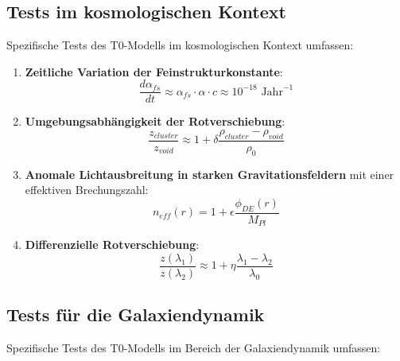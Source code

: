 \documentclass[a4paper,12pt]{article}
\begin{document}
	\subsection{Tests im kosmologischen Kontext}
	
	Spezifische Tests des T0-Modells im kosmologischen Kontext umfassen:
	
	\begin{enumerate}
		\item \textbf{Zeitliche Variation der Feinstrukturkonstante}:
		\begin{equation}
			\frac{d\alpha_{fs}}{dt} \approx \alpha_{fs} \cdot \alpha \cdot c \approx 10^{-18} \text{ Jahr}^{-1}
		\end{equation}
		
		\item \textbf{Umgebungsabhängigkeit der Rotverschiebung}:
		\begin{equation}
			\frac{z_{cluster}}{z_{void}} \approx 1 + \delta\frac{\rho_{cluster} - \rho_{void}}{\rho_0}
		\end{equation}
		
		\item \textbf{Anomale Lichtausbreitung in starken Gravitationsfeldern} mit einer effektiven Brechungszahl:
		\begin{equation}
			n_{eff}(r) = 1 + \epsilon \frac{\phi_{DE}(r)}{M_{Pl}}
		\end{equation}
		
		\item \textbf{Differenzielle Rotverschiebung}:
		\begin{equation}
			\frac{z(\lambda_1)}{z(\lambda_2)} \approx 1 + \eta\frac{\lambda_1 - \lambda_2}{\lambda_0}
		\end{equation}
	\end{enumerate}
	
	\subsection{Tests für die Galaxiendynamik}
	
	Spezifische Tests des T0-Modells im Bereich der Galaxiendynamik umfassen:
	
\end{document}
